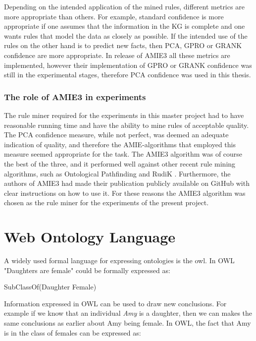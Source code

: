 Depending on the intended application of the mined rules, different metrics are more appropriate than others. For example, standard confidence is more appropriate if one assumes that the information in the KG is complete and one wants rules that model the data as closely as possible. If the intended use of the rules on the other hand is to predict new facts, then PCA, GPRO or GRANK confidence are more appropriate. In release of AMIE3 all these metrics are implemented, however their implementation of GPRO or GRANK confidence was still in the experimental stages, therefore PCA confidence was used in this thesis.


\subsubsection{The role of AMIE3 in experiments}
The rule miner required for the experiments in this master project had to have reasonable running time and have the ability to mine rules of acceptable quality. The PCA confidence measure, while not perfect, was deemed an adequate indication of quality, and therefore the AMIE-algorithms that employed this measure seemed appropriate for the task. The AMIE3 algorithm was of course the best of the three, and it performed well against other recent rule mining algorithms, such as Ontological Pathfinding \cite{op} and RudiK \cite{rudik}. Furthermore, the authors of AMIE3 had made their publication publicly available on GitHub with clear instructions on how to use it. For these reasons the AMIE3 algorithm was chosen as the rule miner for the experiments of the present project.








\iffalse 
\section{Web Ontology Language}
A widely used formal language for expressing ontologies is the \gls{owl}. In OWL "Daughters are female" could be formally expressed as:

\centerline{\textsf{SubClassOf(Daughter Female)}}
Information expressed in OWL can be used to draw new conclusions. For example if we know that an individual \emph{Amy} is a daughter, then we can makes the same conclusions as earlier about Amy being female. In OWL, the fact that Amy is in the class of females can be expressed as:

